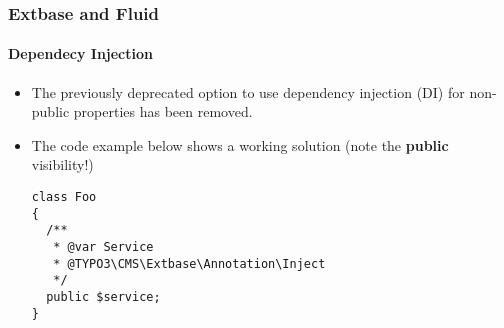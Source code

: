 %

\begin{frame}[fragile]
	\frametitle{Extbase and Fluid}
	\framesubtitle{Dependecy Injection}


	\begin{itemize}
		\item The previously deprecated option to use dependency injection (DI)
			for non-public properties has been removed.
		\item The code example below shows a working solution\newline
			\small(note the \textbf{public} visibility!)\normalsize
\begin{lstlisting}
class Foo
{
  /**
   * @var Service
   * @TYPO3\CMS\Extbase\Annotation\Inject
   */
  public $service;
}
\end{lstlisting}

	\end{itemize}

\end{frame}

